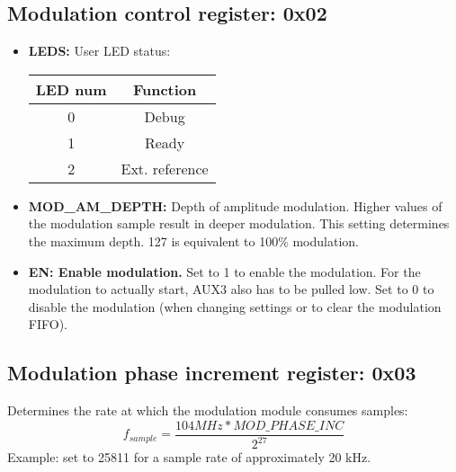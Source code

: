 \documentclass{article}
\newcommand{\bitrect}[2]{
  \begin{pgfonlayer}{foreground}
    \draw [thick] (0,0) rectangle (#1,1);
    \pgfmathsetmacro\result{#1-1}
    \foreach \x in {1,...,\result}
      \draw [thick] (\x,1) -- (\x, 0.8);
  \end{pgfonlayer}
  \bitlabels{#1}{#2}
}
\newcommand{\rwbits}[3]{
  \draw [thick] (#1,0) rectangle ++(#2,1) node[pos=0.5]{#3};
  \pgfmathsetmacro\start{#1+0.5}
  \pgfmathsetmacro\finish{#1+#2-0.5}
}
\newcommand{\robits}[3]{
  \begin{pgfonlayer}{background}
    \draw [thick, fill=lightgray] (#1,0) rectangle ++(#2,1) node[pos=0.5]{#3};
  \end{pgfonlayer}
  \pgfmathsetmacro\start{#1+0.5}
  \pgfmathsetmacro\finish{#1+#2-0.5}
}
\newcommand{\bitlabels}[2]{
  \foreach \bit in {1,...,#1}{
     \pgfmathsetmacro\result{#2}
     \node [above] at (\bit-0.5, 1) {\pgfmathprintnumber{\result}};
   }
}
\begin{document}
\subsection{Modulation control register: 0x02}
\begin{center}
\end{center}
\begin{itemize}
\item \textbf{LEDS:} User LED status:
\begin{center}
\begin{tabular}{ c|c }
LED num & Function\\
 \hline
0 & Debug\\
1 & Ready\\
2 & Ext. reference\\
\end{tabular}
\end{center}
\item \textbf{MOD\_AM\_DEPTH:} Depth of amplitude modulation. Higher values of the modulation sample result in deeper modulation. This setting determines the maximum depth. 127 is equivalent to 100\% modulation.
\item \textbf{EN: Enable modulation.} Set to 1 to enable the modulation. For the modulation to actually start, AUX3 also has to be pulled low. Set to 0 to disable the modulation (when changing settings or to clear the modulation FIFO).
\end{itemize}

\subsection{Modulation phase increment register: 0x03}
\begin{center}
\end{center}

Determines the rate at which the modulation module consumes samples:
$$
f_{sample} = \frac{104 MHz * MOD\_PHASE\_INC}{2^{27}}
$$
Example: set to 25811 for a sample rate of approximately 20 kHz.
\end{document}
